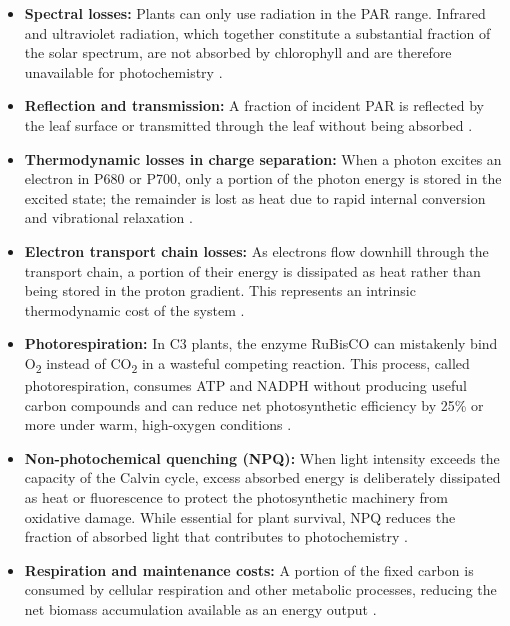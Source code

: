 \documentclass[conference]{IEEEtran}
\begin{document}
\begin{itemize}
    \item \textbf{Spectral losses:} Plants can only use radiation in the PAR range. Infrared and ultraviolet radiation, which together constitute a substantial fraction of the solar spectrum, are not absorbed by chlorophyll and are therefore unavailable for photochemistry \cite{ripe_pdf}.
    
    \item \textbf{Reflection and transmission:} A fraction of incident PAR is reflected by the leaf surface or transmitted through the leaf without being absorbed \cite{repository_up}.
    
    \item \textbf{Thermodynamic losses in charge separation:} When a photon excites an electron in P680 or P700, only a portion of the photon energy is stored in the excited state; the remainder is lost as heat due to rapid internal conversion and vibrational relaxation \cite{repository_up}.
    
    \item \textbf{Electron transport chain losses:} As electrons flow downhill through the transport chain, a portion of their energy is dissipated as heat rather than being stored in the proton gradient. This represents an intrinsic thermodynamic cost of the system \cite{sciencedirect_losses}.
    
    \item \textbf{Photorespiration:} In C3 plants, the enzyme RuBisCO can mistakenly bind O\textsubscript{2} instead of CO\textsubscript{2} in a wasteful competing reaction. This process, called photorespiration, consumes ATP and NADPH without producing useful carbon compounds and can reduce net photosynthetic efficiency by 25\% or more under warm, high-oxygen conditions \cite{pmc_efficiency}.
    
    \item \textbf{Non-photochemical quenching (NPQ):} When light intensity exceeds the capacity of the Calvin cycle, excess absorbed energy is deliberately dissipated as heat or fluorescence to protect the photosynthetic machinery from oxidative damage. While essential for plant survival, NPQ reduces the fraction of absorbed light that contributes to photochemistry \cite{sciencedirect_losses, repository_up}.
    
    \item \textbf{Respiration and maintenance costs:} A portion of the fixed carbon is consumed by cellular respiration and other metabolic processes, reducing the net biomass accumulation available as an energy output \cite{ars_usda_pubs}.
\end{itemize}
\end{document}
